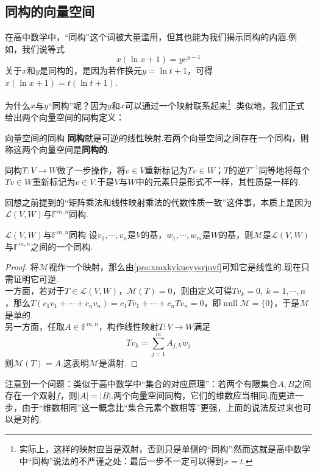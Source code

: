 \documentclass[lang=cn, zihao=5]{elegantbook}
\newcommand{\F}{\mathbb{F}}
\newcommand{\lmap}{\mathcal{L}}
\newcommand{\mmatrix}{\mathcal{M}}
\DeclareMathOperator{\nul}{null}
\begin{document}
\subsection{同构的向量空间}

在高中数学中，“同构”这个词被大量滥用，但其也能为我们揭示同构的内涵.例如，我们说等式$$x(\ln x+1) = ye^{y-1}$$关于$x$和$y$是同构的，是因为若作换元$y=\ln t+1$，可得$x(\ln x +1) = t(\ln t +1)$.

为什么$x$与$y$“同构”呢？因为$y$和$x$可以通过一个映射联系起来\footnote{实际上，这样的映射应当是双射，否则只是单侧的“同构”.然而这就是高中数学中“同构”说法的不严谨之处：最后一步不一定可以得到$x=t$.} .类似地，我们正式给出两个向量空间的同构定义：

\begin{definition}{向量空间的同构}
	\textbf{同构}就是可逆的线性映射.若两个向量空间之间存在一个同构，则称这两个向量空间是\textbf{同构的}.
\end{definition}

同构$T:V \to W$做了一步操作，将$v \in V$重新标记为$Tv \in W$；$T$的逆$T^{-1}$同等地将每个$Tv \in W$重新标记为$v \in V$.于是$V$与$W$中的元素只是形式不一样，其性质是一样的.

回想之前提到的“矩阵乘法和线性映射乘法的代数性质一致”这件事，本质上是因为$\lmap (V,W)$与$\F ^{m,n}$同构.

\begin{proposition}{$\lmap (V,W)$与$\F ^{m,n}$同构}
	设$v_1, \cdots ,v_n$是$V$的基，$w_1, \cdots ,w_m$是$W$的基，则$\mmatrix$是$\lmap (V,W)$与$\F ^{m,n}$之间的一个同构.
\end{proposition}
\begin{proof}
	将$\mmatrix$视作一个映射，那么由\ref{pro:xmxkykueyysrjuvf}可知它是线性的.现在只需证明它可逆. \\
	一方面，若对于$T \in \lmap (V,W)$，$\mmatrix (T)=0$，则由定义可得$Tv_k=0,~k=1,\cdots ,n$，那么$T(c_1v_1 + \cdots + c_nv_n)=c_1Tv_1 + \cdots + c_nTv_n =0$，即$\nul \mmatrix = \{ 0 \}$，于是$\mmatrix$是单的. \\ 
	另一方面，任取$A \in \F ^{m,n}$，构作线性映射$T:V \to W$满足$$Tv_k = \sum_{j=1}^{m} A_{j,k} w_j$$
	则$\mmatrix (T) =A$.这表明$\mmatrix$是满射.
\end{proof}

注意到一个问题：类似于高中数学中“集合的对应原理”：若两个有限集合$A,B$之间存在一个双射$f$，则$|A|=|B|$.两个向量空间同构，它们的维数应当相同.而更进一步，由于“维数相同”这一概念比“集合元素个数相等”更强，上面的说法反过来也可以是对的.
\end{document}
